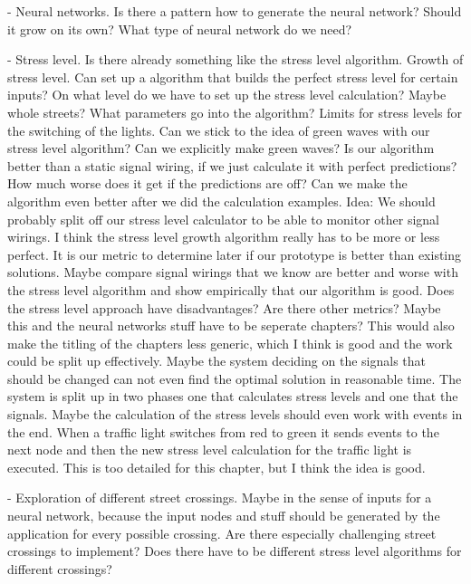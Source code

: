 - Neural networks. Is there a pattern how to  generate the neural network? Should it grow on its own? What type of neural network do we need?

- Stress level. Is there already something like the stress level algorithm. Growth of stress level. Can set up a algorithm that builds the perfect stress level for certain inputs? On what level do we have to set up the stress level calculation? Maybe whole streets? What parameters go into the algorithm? Limits for stress levels for the switching of the lights. Can we stick to the idea of green waves with our stress level algorithm? Can we explicitly make green waves? Is our algorithm better than a static signal wiring, if we just calculate it with perfect predictions? How much worse does it get if the predictions are off? Can we make the algorithm even better after we did the calculation examples. Idea: We should probably split off our stress level calculator to be able to monitor other signal wirings. I think the stress level growth algorithm really has to be more or less perfect. It is our metric to determine later if our prototype is better than existing solutions. Maybe compare signal wirings that we know are better and worse with the stress level algorithm and show empirically that our algorithm is good. Does the stress level approach have disadvantages? Are there other metrics? Maybe this and the neural networks stuff have to be seperate chapters? This would also make the titling of the chapters less generic, which I think is good and the work could be split up effectively. Maybe the system deciding on the signals that should be changed can not even find the optimal solution in reasonable time. The system is split up in two phases one that calculates stress levels and one that the signals. Maybe the calculation of the stress levels should even work with events in the end. When a traffic light switches from red to green it sends events to the next node and then the new stress level calculation for the traffic light is executed. This is too detailed for this chapter, but I think the idea is good.

- Exploration of different street crossings. Maybe in the sense of inputs for a neural network, because the input nodes and stuff should be generated by the application for every possible crossing. Are there especially challenging street crossings to implement? Does there have to be different stress level algorithms for different crossings?

